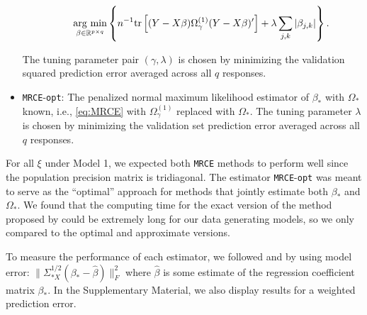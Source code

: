 \documentclass[12pt]{article}
\newcommand{\argmin}{\operatorname*{arg \ min}}
\begin{document}
\begin{itemize}
\begin{enumerate}
		\begin{equation}\label{eq:MRCE}
		\argmin_{\beta \in \mathbb{R}^{p \times q}} \left\{ n^{-1} {\rm tr}\left[(Y - X \beta) \Omega^{(1)}_\gamma (Y - X \beta)'\right] + \lambda \sum_{j,k} |\beta_{j,k}| \right\}.
		\end{equation}
	\end{enumerate}
	The tuning parameter pair $(\gamma, \lambda)$ is chosen by minimizing the validation squared prediction error averaged across all $q$ responses. 
	\item \texttt{MRCE}-\texttt{opt}: The penalized normal maximum likelihood estimator of $\beta_*$ with $\Omega_*$ known, i.e., \eqref{eq:MRCE} with $\Omega^{(1)}_\gamma$ replaced with $\Omega_*$.  The tuning parameter $\lambda$ is chosen by minimizing the validation set prediction error averaged across all $q$ responses. 
\end{itemize}

For all $\xi$ under Model 1, we expected both \texttt{MRCE} methods to perform well since the population precision matrix is tridiagonal. The estimator \texttt{MRCE}-\texttt{opt} was meant to serve as the ``optimal'' approach for methods that jointly estimate both $\beta_*$ and $\Omega_*$. We found that the computing time for the exact version of the method proposed by \citet{rothman2010sparse} could be extremely long for our data generating models, so we only compared to the optimal and approximate versions. 


To measure the performance of each estimator, we followed \citet{yuan2007dimension} and \citet{molstad2016indirect} by using model error:
$\|\Sigma_{*X}^{1/2}(\beta_* - \hat{\beta})\|^2_F$
where $\hat{\beta}$ is some estimate of the regression coefficient matrix $\beta_*$. In the Supplementary Material, we also display results for a weighted prediction error. 


\end{document}
